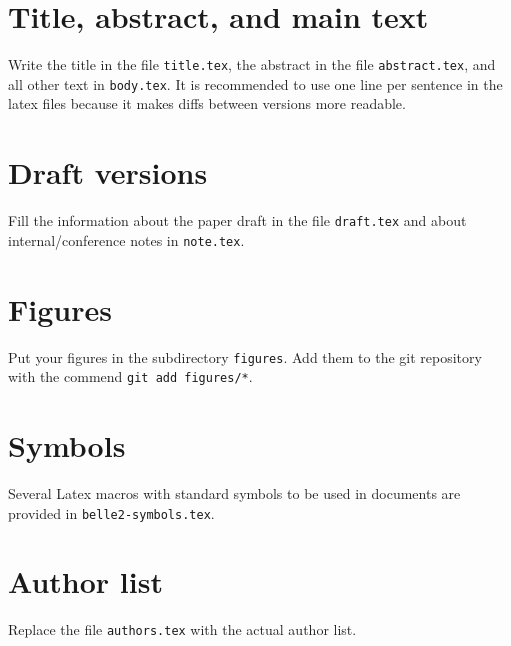 \section{Title, abstract, and main text}
Write the title in the file \texttt{title.tex}, the abstract in the file \texttt{abstract.tex}, and all other text in \texttt{body.tex}.
It is recommended to use one line per sentence in the latex files because it makes diffs between versions more readable.

\section{Draft versions}
Fill the information about the paper draft in the file \texttt{draft.tex} and about internal/conference notes in \texttt{note.tex}.

\section{Figures}
Put your figures in the subdirectory \texttt{figures}.
Add them to the git repository with the commend \texttt{git add figures/*}.

\section{Symbols}
Several Latex macros with standard symbols to be used in \belletwo documents are provided in \texttt{belle2-symbols.tex}.

\section{Author list}
Replace the file \texttt{authors.tex} with the actual author list.

